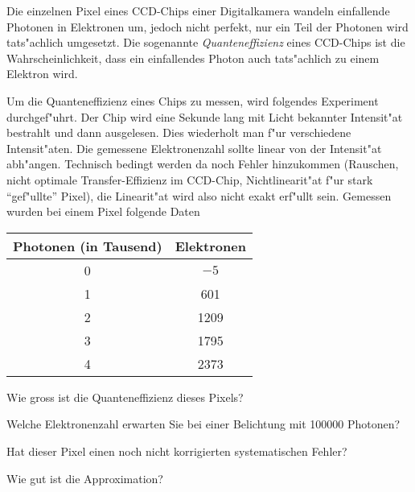 Die einzelnen Pixel eines CCD-Chips einer Digitalkamera wandeln einfallende
Photonen in Elektronen um, jedoch nicht perfekt, nur ein Teil der Photonen
wird tats"achlich umgesetzt. Die sogenannte {\it Quanteneffizienz} eines
CCD-Chips ist die Wahrscheinlichkeit, dass ein einfallendes Photon
auch tats"achlich zu einem Elektron wird.

Um die Quanteneffizienz eines Chips zu messen, wird folgendes Experiment
durchgef"uhrt.
Der Chip wird eine Sekunde lang mit Licht bekannter
Intensit"at bestrahlt und dann ausgelesen.
Dies wiederholt man f"ur verschiedene Intensit"aten.
Die gemessene Elektronenzahl sollte linear von der Intensit"at abh"angen.
Technisch bedingt werden da noch Fehler hinzukommen
(Rauschen, nicht optimale Transfer-Effizienz im CCD-Chip,
Nichtlinearit"at f"ur stark ``gef"ullte'' Pixel),
die Linearit"at wird also nicht exakt erf"ullt sein.
Gemessen wurden bei einem Pixel folgende Daten
\begin{center}
\begin{tabular}{|c|c|}
\hline
Photonen (in Tausend)&Elektronen\\
\hline
0&$-5$\\
1&601\\
2&1209\\
3&1795\\
4&2373\\
\hline
\end{tabular}
\end{center}
\begin{teilaufgaben}
\item
Wie gross ist die Quanteneffizienz dieses Pixels?
\item
Welche Elektronenzahl erwarten Sie bei einer Belichtung mit
100000 Photonen?
\item
Hat dieser Pixel einen noch nicht korrigierten systematischen Fehler?
\item
Wie gut ist die Approximation?
\end{teilaufgaben}

